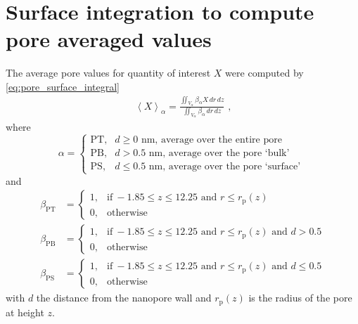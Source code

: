 \clearpage

\section{Surface integration to compute pore averaged values}
%

The average pore values for quantity of interest $X$ were computed by \cref{eq:pore_surface_integral}
%
\begin{align}\label{eq:pore_surface_integral}
  \left< X \right>_{\alpha} =
    \displaystyle\frac{\displaystyle\iint_{V_{\alpha}} \beta_{\alpha} X \,dr\,dz}
                      {\displaystyle\iint_{V_{\alpha}} \beta_{\alpha} \,dr\,dz}
  \text{ ,}
\end{align}
%
where
%
\begin{equation}
  \alpha=
  \begin{cases}
    \text{PT}, & d \ge 0  \text{~nm} \text{, average over the entire pore} \\
    \text{PB}, & d > 0.5  \text{~nm} \text{, average over the pore `bulk' }  \\
    \text{PS}, & d \le 0.5\text{~nm} \text{, average over the pore `surface' }
  \end{cases}
\end{equation}
%
and
%
\begin{align}
  \beta_{\text{PT}} &=
  \begin{cases}
    1, & \text{if}\ -1.85\le z \le 12.25  \text{ and } r \le r_\text{p}(z) \\
    0, & \text{otherwise}
  \end{cases} \\
  \beta_{\text{PB}} &=
  \begin{cases}
  1, & \text{if}\ -1.85\le z \le 12.25  \text{ and } r \le r_\text{p}(z) \text{ and } d > 0.5 \\
  0, & \text{otherwise}
  \end{cases} \\
  \beta_{\text{PS}} &=
  \begin{cases}
  1, & \text{if}\ -1.85\le z \le 12.25  \text{ and } r \le r_\text{p}(z) \text{ and } d \le 0.5 \\
  0, & \text{otherwise}
  \end{cases}
\end{align}
%
with $d$ the distance from the nanopore wall and $r_\text{p}(z)$ is the radius of the pore at height $z$.

\cleardoublepage

